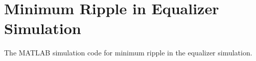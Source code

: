 \chapter{Minimum Ripple in Equalizer Simulation}\label{app:equalizer}

The MATLAB simulation code for minimum ripple in the equalizer simulation. 



